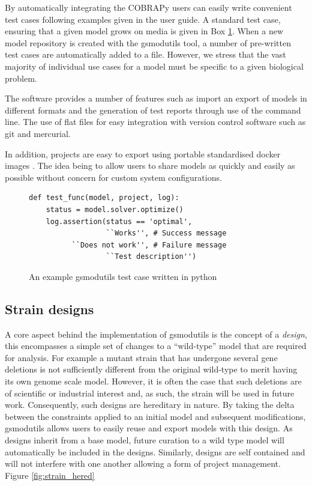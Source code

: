 \documentclass[a4paper,10pt]{article}
\begin{document}
By automatically integrating the COBRAPy \cite{ebrahim2013cobrapy} users can easily write convenient test cases following examples given in the user guide.
A standard test case, ensuring that a given model grows on media is given in Box \ref{fig:test_case}.
When a new model repository is created with the gsmodutils tool, a number of pre-written test cases are automatically added to a file.
However, we stress that the vast majority of individual use cases for a model must be specific to a given biological problem.

The software provides a number of features such as import an export of models in different formats and the generation of test reports through use of the command line. 
The use of flat files for easy integration with version control software such as git and mercurial.

In addition, projects are easy to export using portable standardised docker images \cite{merkel2014docker}. 
The idea being to allow users to share models as quickly and easily as possible without concern for custom system configurations.


\begin{figure}[ht]

\lstset{language=Python}   
\begin{lstlisting}
def test_func(model, project, log):
    status = model.solver.optimize()
    log.assertion(status == 'optimal',
                  ``Works'', # Success message
		  ``Does not work'', # Failure message
                  ``Test description'')
\end{lstlisting}
\label{fig:test_case} 
\caption{An example gsmodutils test case written in python}
\end{figure}

\subsection{Strain designs}
A core aspect behind the implementation of gsmodutils is the concept of a \textit{design}, this encompasses a simple set of changes to a ``wild-type'' model that are required for analysis.
For example a mutant strain that has undergone several gene deletions is not sufficiently different from the original wild-type to merit having its own genome scale model.
However, it is often the case that such deletions are of scientific or industrial interest and, as such, the strain will be used in future work.
Consequently, such designs are hereditary in nature.
By taking the delta between the constraints applied to an initial model and subsequent modifications, gsmodutils allows users to easily reuse and export models with this design.
As designs inherit from a base model, future curation to a wild type model will automatically be included in the designs.
Similarly, designs are self contained and will not interfere with one another allowing a form of project management.
Figure \ref{fig:strain_hered}
\end{document}
